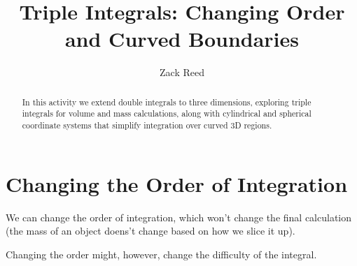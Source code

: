 \documentclass{ximera}
\title{Triple Integrals: Changing Order and Curved Boundaries}
\author{Zack Reed}
\begin{document}
\begin{abstract}
In this activity we extend double integrals to three dimensions, exploring triple integrals for volume and mass calculations, along with cylindrical and spherical coordinate systems that simplify integration over curved 3D regions.
\end{abstract}
\maketitle


\section*{Changing the Order of Integration}

We can change the order of integration, which won't change the final calculation (the mass of an object doens't change based on how we slice it up). 

Changing the order might, however, change the difficulty of the integral.
\end{document}
